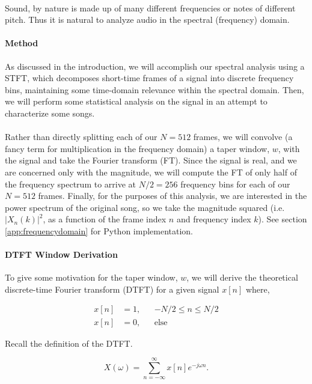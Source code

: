 \documentclass[11pt,a4paper]{article}
\begin{document}
\paragraph*{} Sound, by nature is made up of many different frequencies or notes of different pitch. Thus it is natural to analyze audio in the spectral (frequency) domain. 
\paragraph{Method} As discussed in the introduction, we will accomplish our spectral analysis using a STFT, which decomposes short-time frames of a signal into discrete frequency bins, maintaining some time-domain relevance within the spectral domain. Then, we will perform some statistical analysis on the signal in an attempt to characterize some songs.
\paragraph*{} Rather than directly splitting each of our $N=512$ frames, we will convolve (a fancy term for multiplication in the frequency domain) a taper window, $w$, with the signal and take the Fourier transform (FT). Since the signal is real, and we are concerned only with the magnitude, we will compute the FT of only half of the frequency spectrum to arrive at $N/2=256$ frequency bins for each of our $N=512$ frames. Finally, for the purposes of this analysis, we are interested in the power spectrum of the original song, so we take the magnitude squared (i.e. $|X_n(k)|^2$, as a function of the frame index $n$ and frequency index $k$). See section \ref{app:frequencydomain} for Python implementation.
\paragraph{DTFT Window Derivation} To give some motivation for the taper window, $w$, we will derive the theoretical discrete-time Fourier transform (DTFT) for a given signal $x[n]$ where,

\begin{align} \label{eqn:rect}
x[n] &= 1, && -N/2 \leq n \leq N/2 \\
x[n] &= 0, && \text{else}
\end{align}

Recall the definition of the DTFT.

\begin{equation} \label{eqn:dtft}
X(\omega)=\sum_{n=-\infty}^{\infty} x[n]e^{-j\omega n}.
\end{equation}
\end{document}
